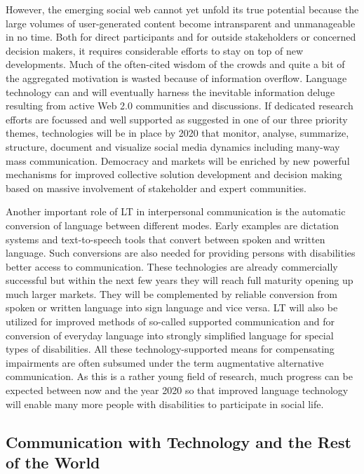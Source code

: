 \documentclass[10pt, plain]{../../metanetpaper}
\begin{document}
\begin{multicols}{2}
However, the emerging social web cannot yet unfold its true potential because the large volumes of user-generated content become intransparent and unmanageable in no time. Both for direct participants and for outside stakeholders or concerned decision makers, it requires considerable efforts to stay on top of new developments. Much of the often-cited wisdom of the crowds and quite a bit of the aggregated motivation is wasted because of information overflow. Language technology can and will eventually harness the inevitable information deluge resulting from active Web 2.0 communities and discussions. If dedicated research efforts are focussed and well supported as suggested in one of our three priority themes, technologies will be in place by 2020 that monitor, analyse, summarize, structure, document and visualize social media dynamics including many-way mass communication. Democracy and markets will be enriched by new powerful mechanisms for improved collective solution development and decision making based on massive involvement of stakeholder and expert communities.
 
Another important role of LT in interpersonal communication is the automatic conversion of language between different modes. Early examples are dictation systems and text-to-speech tools that convert between spoken and written language. Such conversions are also needed for providing persons with disabilities better access to communication. These technologies are already commercially successful but within the next few years they will reach full maturity opening up much larger markets.  They will be complemented by reliable conversion from spoken or written language into sign language and vice versa. LT will also be utilized for improved methods of so-called supported communication and for conversion of everyday language into strongly simplified language for special types of disabilities. All these technology-supported means for compensating impairments are often subsumed under the term augmentative alternative communication. As this is a rather young field of research, much progress can be expected between now and the year 2020 so that improved language technology will enable many more people with disabilities to participate in social life.

\subsection{Communication with Technology and the Rest of the World}
\label{sec:comm-with-techn}


\end{multicols}
\end{document}
